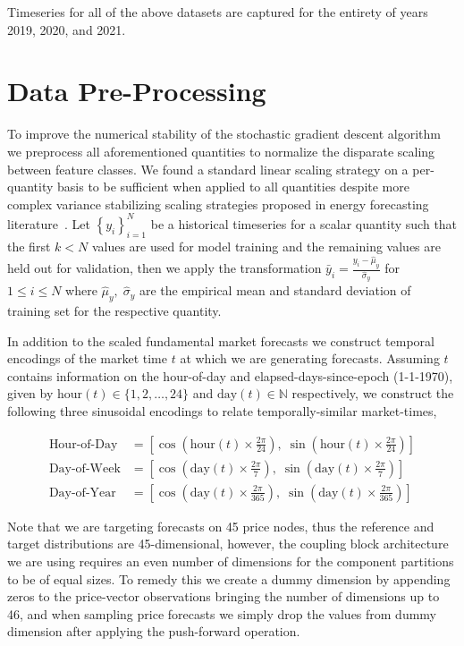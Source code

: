 Timeseries for all of the above datasets are captured for the entirety of years 2019, 2020, and 2021.

\section{Data Pre-Processing}\label{sec:data-pre-processing}

To improve the numerical stability of the stochastic gradient descent algorithm we preprocess all
aforementioned quantities to normalize the disparate scaling between feature classes.
We found a standard linear scaling strategy on a per-quantity basis to be sufficient when applied to all quantities
despite more complex variance stabilizing scaling strategies proposed in energy forecasting literature~\cite{7997921}.
Let $\left\{ y_i \right\}_{i=1}^N$ be a historical timeseries for a scalar quantity such that the first $k < N$ values are
used for model training and the remaining values are held out for validation, then we apply the transformation
$\bar{y}_i = \frac{y_i - \hat{\mu}_y}{\hat{\sigma}_y}$ for $1 \leq i \leq N$ where $\hat{\mu}_y,\;\hat{\sigma}_y$ are
the empirical mean and standard deviation of training set for the respective quantity.

In addition to the scaled fundamental market forecasts we construct temporal encodings of the market time $t$ at which
we are generating forecasts.
Assuming $t$ contains information on the hour-of-day and elapsed-days-since-epoch (1-1-1970), given by
$\text{hour}(t) \in \{1, 2, \dots, 24\}$ and $\text{day}(t) \in \mathbb{N}$ respectively, we construct the following three
sinusoidal encodings to relate temporally-similar market-times,

\begin{align*}
    \text{Hour-of-Day} &= \left[ \cos\left( \text{hour}(t) \times \frac{2\pi}{24} \right), \; \sin\left( \text{hour}(t) \times \frac{2\pi}{24} \right)\right] \\
    \text{Day-of-Week} &= \left[ \cos\left( \text{day}(t) \times \frac{2\pi}{7} \right), \; \sin\left( \text{day}(t) \times \frac{2\pi}{7} \right)\right] \\
    \text{Day-of-Year} &= \left[ \cos\left( \text{day}(t) \times \frac{2\pi}{365} \right), \; \sin\left( \text{day}(t) \times \frac{2\pi}{365} \right)\right]
\end{align*}


Note that we are targeting forecasts on 45 price nodes, thus the reference and target
distributions are 45-dimensional, however, the coupling block architecture we are using requires an even number of
dimensions for the component partitions to be of equal sizes.
To remedy this we create a dummy dimension by appending zeros to the price-vector observations bringing the number of
dimensions up to 46, and when sampling price forecasts we simply drop the values from dummy dimension after applying
the push-forward operation.

